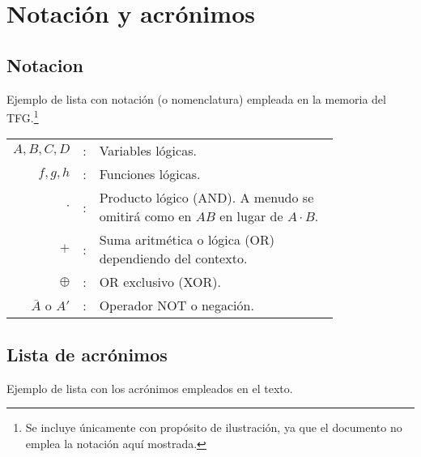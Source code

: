 %
%
\cleardoublepage
{} %


\chapter*{Notación y acrónimos} %

\section*{Notacion}
Ejemplo de lista con notación (o nomenclatura) empleada en la memoria del TFG.\footnote{Se incluye únicamente con propósito de ilustración, ya que el documento no emplea la notación aquí mostrada.}

\begin{tabular}{r r p{0.8\linewidth}}
$A, B, C, D$	& : & Variables lógicas. \\
$f, g, h$		& :	& Funciones lógicas. \\
$\cdot$			& : & Producto lógico (AND). A menudo se omitirá como en $A 
B$ en lugar de $A \cdot B$.\\
$+$				& : & Suma aritmética o lógica (OR) dependiendo del 
contexto.\\
$\oplus$		& : & OR exclusivo (XOR).\\
$\overline{A}$ o ${A}'$	& : & Operador NOT o negación.
\end{tabular}

\section*{Lista de acrónimos}
Ejemplo de lista con los acrónimos empleados en el texto.

